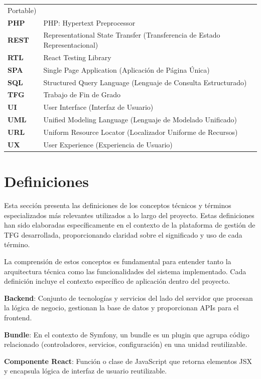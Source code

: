 \documentclass[12pt,a4paper,oneside]{report}
\begin{document}
\begin{longtable}[]{@{}
  >{\raggedright\arraybackslash}p{}
  >{\raggedright\arraybackslash}p{}@{}}
Portable) \\
\textbf{PHP} & PHP: Hypertext Preprocessor \\
\textbf{REST} & Representational State Transfer (Transferencia de Estado
Representacional) \\
\textbf{RTL} & React Testing Library \\
\textbf{SPA} & Single Page Application (Aplicación de Página Única) \\
\textbf{SQL} & Structured Query Language (Lenguaje de Consulta
Estructurado) \\
\textbf{TFG} & Trabajo de Fin de Grado \\
\textbf{UI} & User Interface (Interfaz de Usuario) \\
\textbf{UML} & Unified Modeling Language (Lenguaje de Modelado
Unificado) \\
\textbf{URL} & Uniform Resource Locator (Localizador Uniforme de
Recursos) \\
\textbf{UX} & User Experience (Experiencia de Usuario) \\
\end{longtable}

\section{Definiciones}\label{definiciones}

Esta sección presenta las definiciones de los conceptos técnicos y
términos especializados más relevantes utilizados a lo largo del
proyecto. Estas definiciones han sido elaboradas específicamente en el
contexto de la plataforma de gestión de TFG desarrollada, proporcionando
claridad sobre el significado y uso de cada término.

La comprensión de estos conceptos es fundamental para entender tanto la
arquitectura técnica como las funcionalidades del sistema implementado.
Cada definición incluye el contexto específico de aplicación dentro del
proyecto.

\textbf{Backend}: Conjunto de tecnologías y servicios del lado del
servidor que procesan la lógica de negocio, gestionan la base de datos y
proporcionan APIs para el frontend.

\textbf{Bundle}: En el contexto de Symfony, un bundle es un plugin que
agrupa código relacionado (controladores, servicios, configuración) en
una unidad reutilizable.

\textbf{Componente React}: Función o clase de JavaScript que retorna
elementos JSX y encapsula lógica de interfaz de usuario reutilizable.
\end{document}

